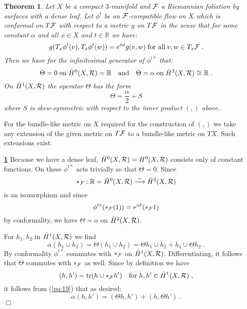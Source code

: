 \documentclass[11pt,leqno]{article}
\newcommand{\R}{{\mathbb{R}}}
\newcommand{\tr}{\mathrm{tr}}
\newcommand{\Fh}{{\cal F}}
\newcommand{\Rh}{{\cal R}}
\newcommand{\oH}{\bar{H}}
\newcommand{\silo}{\stackrel{\sim}{\longrightarrow}}
\newtheorem{theorem}{Theorem}[section]
\newenvironment{remarknn}{\bigskip \noindent {\bf Remark}}{}
\newenvironment{proofof}{\bigskip \noindent {\bf Proof of}}{\mbox{}\hfill$\Box$}
\begin{document}
\begin{theorem}
  \label{t4}
Let $X$ be a compact $3$-manifold and $\Fh$ a Riemannian foliation by surfaces with a dense leaf. Let $\phi^t$ be an $\Fh$-compatible flow on $X$ which is conformal on $T\Fh$ with respect to a metric $g$ on $T\Fh$ in the sense that for some constant $\alpha$ and all $x \in X$ and $t \in \R$ we have: 
\begin{equation}
  \label{eq:18}
  g (T_x \phi^t (v) , T_x \phi^t (w)) = e^{\alpha t} g (v,w) \; \mbox{for all} \; v,w \in T_x \Fh \; .
\end{equation}
Then we have for the infinitesimal generator of $\phi^{t*}$ that:
\[
\Theta = 0 \; \mbox{on} \; \oH^0 (X,\Rh) = \R \quad \mbox{and} \quad \Theta = \alpha \; \mbox{on} \; \oH^2 (X,\Rh) \cong \R \; .
\]
On $\oH^1 (X,\Rh)$ the operator $\Theta$ has the form
\[
\Theta = \frac{\alpha}{2} + S
\]
where $S$ is skew-symmetric with respect to the inner product $( , )$ above.
\end{theorem}

\begin{remarknn}
   For the bundle-like metric on $X$ required for the construction of $(,)$ we take any extension of the given metric on $T \Fh$ to a bundle-like metric on $TX$. Such extensions exist.
\end{remarknn}

\begin{proofof}
  {\bf \ref{t4}} Because we have a dense leaf, $\oH^0 (X,\Rh) = H^0 (X,\Rh)$ consists only of constant functions. On these $\phi^{t*}$ acts trivially so that $\Theta = 0$. Since
\[
*_{\Fh} : \R = \oH^0 (X,\Rh) \silo \oH^2 (X,\Rh)
\]
is an isomorphism and since
\[
\phi^{t*} (*_{\Fh} (1)) = e^{\alpha t} (*_{\Fh} 1)
\]
by conformality, we have $\Theta = \alpha$ on $\oH^2 (X,\Rh)$.

For $h_1 , h_2$ in $\oH^1 (X,\Rh)$ we find
\begin{equation}
  \label{eq:19}
  \alpha (h_1 \cup h_2) = \Theta (h_1 \cup h_2) = \Theta h_1 \cup h_2 + h_1 \cup \Theta h_2 \; .
\end{equation}
By conformality $\phi^{t*}$ commutes with $*_{\Fh}$ on $\oH^1 (X,\Rh)$. Differentiating, it follows that $\Theta$ commutes with $*_{\Fh}$ as well. Since by definition we have
\[
(h, h') = \tr (h \cup *_{\Fh} h') \quad \mbox{for} \; h , h' \in \oH^1 (X,\Rh) \; ,
\]
it follows from (\ref{eq:19}) that as desired:
\[
\alpha ( h , h' ) = ( \Theta h , h' ) + ( h , \Theta h' ) \; .
\]
\end{proofof}
%
\end{document}
